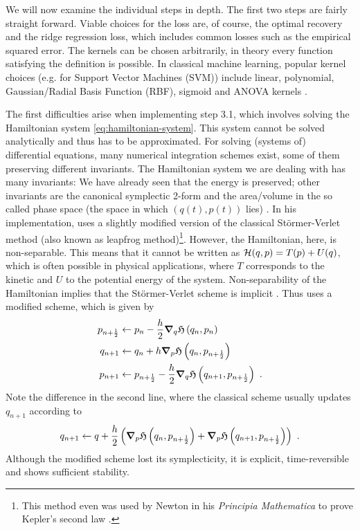 We will now examine the individual steps in depth.
The first two steps are fairly straight forward.
Viable choices for the loss are, of course, the optimal recovery and the ridge regression loss, which includes common losses such as the empirical squared error.
The kernels can be chosen arbitrarily, in theory every function satisfying the definition is possible.
In classical machine learning, popular kernel choices (e.g. for Support Vector Machines (SVM)) include linear, polynomial, Gaussian/Radial Basis Function (RBF), sigmoid and ANOVA kernels \cite{souza21}.

The first difficulties arise when implementing step 3.1, which involves solving the Hamiltonian system \ref{eq:hamiltonian-system}.
This system cannot be solved analytically and thus has to be approximated.
For solving (systems of) differential equations, many numerical integration schemes exist, some of them preserving different invariants.
The Hamiltonian system we are dealing with has many invariants:
We have already seen that the energy is preserved; other invariants are the canonical symplectic 2-form \cite{marsden10} and the area/volume in the so called phase space (the space in which $(q(t), p(t))$ lies) \cite{hairer06}.
In his implementation, \citet{owhadi20} uses a slightly modified version of the classical Störmer-Verlet method (also known as leapfrog method)\footnote{This method even was used by Newton in his \emph{Principia Mathematica} to prove Kepler's second law \cite{hairer03}.}.
However, the Hamiltonian, here, is non-separable.
This means that it cannot be written as $\mathcal{H}(q, p) = T(p) + U(q)$, which is often possible in physical applications, where $T$ corresponds to the kinetic and $U$ to the potential energy of the system.
Non-separability of the Hamiltonian implies that the Störmer-Verlet scheme is implicit \cite{hairer06}.
Thus \citet{owhadi20} uses a modified scheme, which is given by
\begin{align}
	p_{n+\frac{1}{2}} &\gets p_n - \frac{h}{2} \grad_q\mathfrak{H}\left(q_n, p_n\right) \label{eq:leapfrog-p.5}\\
	q_{n+1} &\gets q_n + h \grad_p\mathfrak{H}\left(q_n, p_{n+\frac{1}{2}}\right)\\
	p_{n+1} &\gets p_{n+\frac{1}{2}} - \frac{h}{2} \grad_q\mathfrak{H}\left(q_{n+1}, p_{n+\frac{1}{2}}\right) \label{eq:leapfrog-p1}\ .
\end{align}
Note the difference in the second line, where the classical scheme usually updates $q_{n+1}$ according to 
\begin{equation}
q_{n+1} \gets q + \frac{h}{2} \left(\grad_p\mathfrak{H}\left(q_n, p_{n+\frac{1}{2}}\right) + \grad_p\mathfrak{H}\left(q_{n+1}, p_{n+\frac{1}{2}}\right)\right) \ .
\end{equation}
Although the modified scheme lost its symplecticity, it is explicit, time-reversible and shows sufficient stability.

